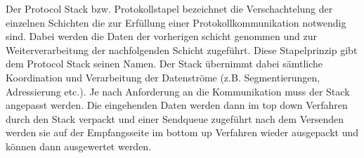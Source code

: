 Der Protocol Stack bzw. Protokollstapel bezeichnet die Verschachtelung der
einzelnen Schichten die zur Erf{\"u}llung einer Protokollkommunikation
notwendig sind. Dabei werden die Daten der vorherigen schicht genommen und zur
Weiterverarbeitung der nachfolgenden Schicht zugef{\"u}hrt. Diese Stapelprinzip
gibt dem Protocol Stack seinen Namen. Der Stack {\"u}bernimmt dabei
s{\"a}mtliche Koordination und Verarbeitung der Datenstr{\"o}me (z.B.
Segmentierungen, Adressierung etc.).
Je nach Anforderung an die Kommunikation muss der Stack angepasst werden. Die
eingehenden Daten werden dann im top down Verfahren durch den Stack verpackt und
einer Sendqueue zugef{\"u}hrt nach dem Versenden werden sie auf der
Empfangsseite im bottom up Verfahren wieder ausgepackt und k{\"o}nnen dann ausgewertet werden.